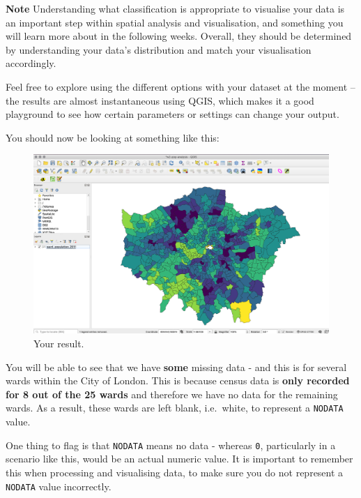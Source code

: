 \documentclass[
]{book}
\begin{document}
\textbf{Note}
Understanding what classification is appropriate to visualise your data is an important step within spatial analysis and visualisation, and something you will learn more about in the following weeks. Overall, they should be determined by understanding your data's distribution and match your visualisation accordingly.

Feel free to explore using the different options with your dataset at the moment -- the results are almost instantaneous using QGIS, which makes it a good playground to see how certain parameters or settings can change your output.

You should now be looking at something like this:

\begin{figure}

{\centering \includegraphics[width=39.89in]{images/w02/ward_2011} 

}

\caption{Your result.}\label{fig:02-ward-result}
\end{figure}

You will be able to see that we have \textbf{some} missing data - and this is for several wards within the City of London. This is because census data is \textbf{only recorded for 8 out of the 25 wards} and therefore we have no data for the remaining wards. As a result, these wards are left blank, i.e.~white, to represent a \texttt{NODATA} value.

One thing to flag is that \texttt{NODATA} means no data - whereas \texttt{0}, particularly in a scenario like this, would be an actual numeric value. It is important to remember this when processing and visualising data, to make sure you do not represent a \texttt{NODATA} value incorrectly.
\end{document}
